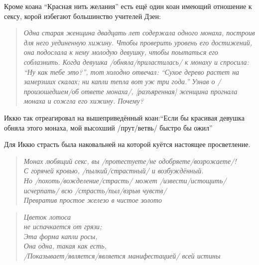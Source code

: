 \begin{ver}
Кроме коана ``Красная нить желания'' есть ещё один коан имеющий
отношение к сексу, корой избегают большинство учителей Дзен:
\end{ver}

\begin{ver}
  \begin{quote}\it
    Одна старая женщина двадцать лет содержала одного монаха, построив
    для него уединенную хижину. Чтобы проверить уровень его
    достижений, она подослала к нему молодую девушку, чтобы поытаться
    его соблазнить. Когда девушка /обняла/приластилась/ к монаху и
    спросила: ``Ну как тебе это?'', тот холодно отвечал: ``Сухое
    дерево растет на замерзших скалах; ни капли тепла вот уж три
    года.''
    Узнав о /произошедшем/об ответе монаха/, [разъяренная] женщина
    прогнала монаха и сожгла его хижину. Почему? 
  \end{quote}
\end{ver}

\begin{ver}
  Иккю так отреагировал на вышеприведённый коан:``Если
  бы красивая девушка обняла этого монаха, мой высохший /прут/ветвь/
  быстро бы ожил''

  Для Иккю страсть была наковальней на которой куётся настоящее
  просветление. 
\end{ver}

\begin{ver}
  \begin{verse}\it
    Монах любящий секс, вы /протестуете/не одобряете/возрожаете/!\\
    С горячей кровью, /пылкий/страстный/ и возбуждённый.\\
    Но /похоть/вожделение/страсть/ может /извести/истощить/исчерпать/
    всю /страсть/пыл/взрыв чувств/\\
    Превратив простое железо в чистое золото\\
  \end{verse}
\end{ver}

\begin{ver}
  \begin{verse}\it
    Цветок лотоса\\
    не испачкается от грязи;\\
    Эта форма капли росы,\\
    Она одна, такая как есть,\\
    /Показывает/является/является манифестацией/ всей истины
  \end{verse}
\end{ver}

